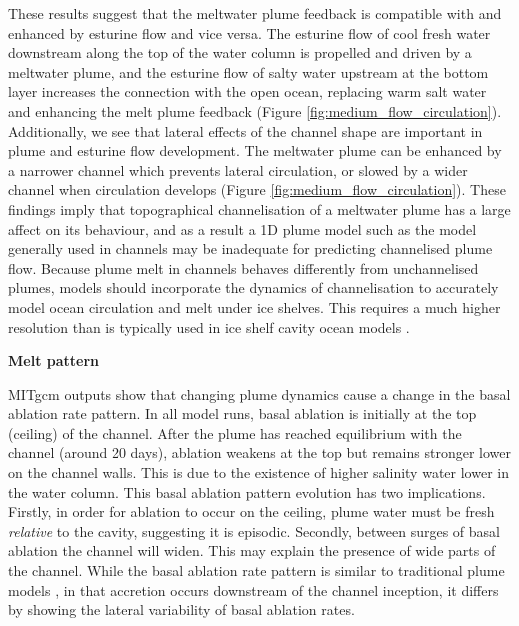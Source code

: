 These results suggest that the meltwater plume feedback is compatible with and enhanced by esturine flow and vice versa. The esturine flow of cool fresh water downstream along the top of the water column is propelled and driven by a meltwater plume, and the esturine flow of salty water upstream at the bottom layer increases the connection with the open ocean, replacing warm salt water and enhancing the melt plume feedback (Figure \ref{fig:medium_flow_circulation}).
Additionally, we see that lateral effects of the channel shape are important in plume and esturine flow development. The meltwater plume can be enhanced by a narrower channel which prevents lateral circulation, or slowed by a wider channel when circulation develops (Figure \ref{fig:medium_flow_circulation}). 
These findings imply that topographical channelisation of a meltwater plume has a large affect on its behaviour, and as a result a 1D plume model such as the \cite{jenkins2011convection} model generally used in channels may be inadequate for predicting channelised plume flow.
Because plume melt in channels behaves differently from unchannelised plumes, models should incorporate the dynamics of channelisation to accurately model ocean circulation and melt under ice shelves. This requires a much higher resolution than is typically used in ice shelf cavity ocean models \cite[e.g.][]{holland2003modelling}. 



\textbf{Melt pattern}

MITgcm outputs show that changing plume dynamics cause a change in the basal ablation rate pattern. In all model runs, basal ablation is initially at the top (ceiling) of the channel. After the plume has reached equilibrium with the channel (around 20 days), ablation weakens at the top but remains stronger lower on the channel walls. This is due to the existence of higher salinity water lower in the water column. This basal ablation pattern evolution has two implications. Firstly, in order for ablation to occur on the ceiling, plume water must be fresh \textit{relative} to the cavity, suggesting it is episodic. Secondly, between surges of basal ablation the channel will widen. This may explain the presence of wide parts of the channel.
While the basal ablation rate pattern is similar to traditional plume models \citep[e.g.][]{jenkins2011convection}, in that accretion occurs downstream of the channel inception, it differs by showing the lateral variability of basal ablation rates. 


